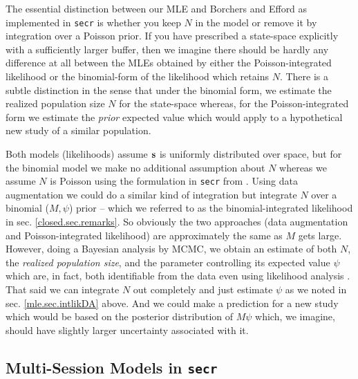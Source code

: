 The essential distinction between our MLE and Borchers and Efford
as implemented in \mbox{\tt secr}
is whether you keep $N$ in the model or remove it by
integration over a Poisson prior. If you have prescribed a state-space
explicitly with a sufficiently larger buffer, then we imagine there
should be hardly any difference at all between the MLEs obtained by
either the Poisson-integrated likelihood or the binomial-form of the
likelihood which retains $N$.
There is a subtle distinction in the sense that under the binomial
form, we estimate the realized population size $N$ for the state-space
whereas, for the Poisson-integrated form we estimate the {\it prior} 
expected value which would apply to a hypothetical new study of a
similar population.


Both models (likelihoods) assume ${\bf s}$ is uniformly distributed
over space, but for the binomial model we make no additional
assumption about $N$ whereas we assume $N$ is Poisson using the
formulation in \mbox{\tt secr} from \citep{borchers_efford:2008}.
Using data augmentation we could do a similar kind of integration but
integrate $N$ over a binomial ($M,\psi$) prior -- which we referred to
as the binomial-integrated likelihood in
sec. \ref{closed.sec.remarks}. So obviously the two approaches (data
augmentation and Poisson-integrated likelihood) are approximately the
same as $M$ gets large. However, doing a Bayesian analysis by MCMC, we
obtain an estimate of both $N$, the {\it realized population size},
and the parameter controlling its expected value $\psi$ which are, in
fact, both identifiable from the data even using likelihood analysis
\citep{royle_etal:2007}.  That said we can integrate $N$ out
completely and just estimate $\psi$ as we noted in sec.
\ref{mle.sec.intlikDA} above.  And we could make a prediction for a
new study which would be based on the posterior distribution of $M
\psi$ which, we imagine, should have slightly larger uncertainty
associated with it.










\subsection{Multi-Session Models in \mbox{\tt secr}}
\label{mle.sec.multisession}

